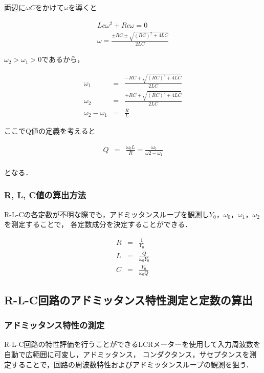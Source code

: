 \documentclass[dvipdfmx,titlepage,a4j]{jsarticle}  %
\numberwithin{equation}{section}
\begin{document}
両辺に$\omega C$をかけて$\omega$を導くと

\begin{eqnarray}
  Lc \omega^2 + Rc\omega = 0\\
  \omega = \frac{\pm RC \pm \sqrt{(RC)^2 + 4LC}}{2LC}
\end{eqnarray}

$\omega_2 > \omega_1 > 0$であるから，

\begin{eqnarray}
  \omega_1 &=& \frac{-RC + \sqrt{(RC)^2 + 4LC}}{2LC} \\
  \omega_2 &=& \frac{+RC + \sqrt{(RC)^2 + 4LC}}{2LC} \\
  \omega_2 - \omega_1 &=& \frac{R}{L}
\end{eqnarray}

ここでQ値の定義を考えると

\begin{eqnarray}
  Q &=& \frac{\omega_0 L}{R} = \frac{\omega_0}{\omega2 - \omega_1}\\
\end{eqnarray}

となる．

\subsubsection{R, L, C値の算出方法}
R-L-Cの各定数が不明な際でも，アドミッタンスループを観測し$Y_0$，$\omega_0$，$\omega_1$，$\omega_2$を測定することで，
各定数成分を決定することができる．

\begin{eqnarray}
  R &=& \frac{1}{Y_0} \\
  L &=& \frac{Q}{\omega_0 Y_0} \\
  C &=& \frac{Y_0}{\omega_0 Q}
\end{eqnarray}

\subsection{R-L-C回路のアドミッタンス特性測定と定数の算出}

\subsubsection{アドミッタンス特性の測定}
R-L-C回路の特性評価を行うことができるLCRメーターを使用して入力周波数を自動で広範囲に可変し，アドミッタンス，
コンダクタンス，サセプタンスを測定することで，回路の周波数特性およびアドミッタンスループの観測を狙う．
\end{document}
